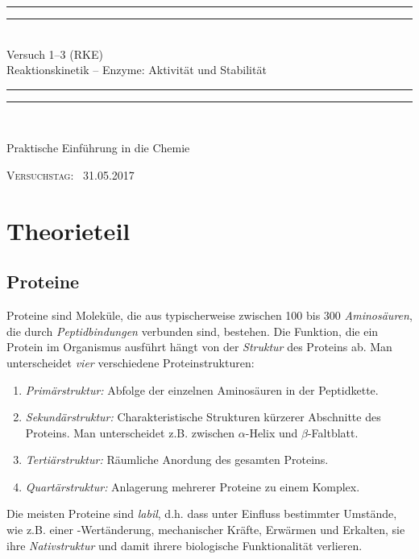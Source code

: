 \documentclass{scrartcl}
\newlength{\drop}
\begin{document}
  \begin{titlepage}
    \textheight
    \centering
    \vspace*{\baselineskip}
    \rule{\textwidth}{1.6pt}\vspace*{-\baselineskip}\vspace*{2pt}
    \rule{\textwidth}{0.4pt}\\[\baselineskip]
    {\LARGE Versuch 1--3 (RKE)\\[0.3\baselineskip] Reaktionskinetik -- Enzyme: Aktivität und Stabilität}\\[0.2\baselineskip]
    \rule{\textwidth}{0.4pt}\vspace*{-\baselineskip}\vspace{3.2pt}
    \rule{\textwidth}{1.6pt}\\[\baselineskip]
    \scshape
    {Praktische Einführung in die Chemie\par}
    \vspace*{2\baselineskip}
    \vfill
    {\scshape Versuchstag:} \        {\large 31.05.2017}\par
  \end{titlepage}
\section{Theorieteil}
\subsection{Proteine}
Proteine sind Moleküle, die aus typischerweise zwischen 100 bis 300 \emph{Aminosäuren}, die durch \emph{Peptidbindungen} verbunden sind, bestehen. Die Funktion, die ein Protein im Organismus ausführt hängt von der \emph{Struktur} des Proteins ab. Man unterscheidet \emph{vier} verschiedene Proteinstrukturen:
\begin{enumerate}
	\item \emph{Primärstruktur:} Abfolge der einzelnen Aminosäuren in der Peptidkette.
	\item \emph{Sekundärstruktur:} Charakteristische Strukturen kürzerer Abschnitte des Proteins. Man unterscheidet z.B. zwischen $\alpha$-Helix und $\beta$-Faltblatt.
	\item \emph{Tertiärstruktur:} Räumliche Anordung des gesamten Proteins.
	\item \emph{Quartärstruktur:} Anlagerung mehrerer Proteine zu einem Komplex.
\end{enumerate}
Die meisten Proteine sind \emph{labil}, d.h. dass unter Einfluss bestimmter Umstände, wie z.B. einer -Wertänderung, mechanischer Kräfte, Erwärmen und Erkalten, sie ihre \emph{Nativstruktur} und damit ihrere biologische Funktionalität verlieren. 
\end{document}
